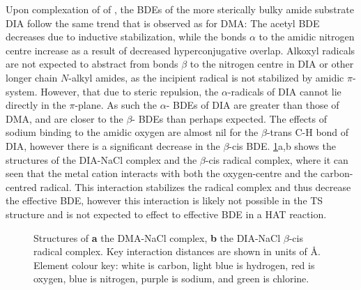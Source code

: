 Upon complexation of  of , the BDEs of the more sterically
bulky amide substrate DIA follow the same trend that is observed as for DMA:
The acetyl  BDE decreases due to inductive stabilization, while the
 bonds $\alpha$ to the amidic nitrogen centre increase as a result of
decreased hyperconjugative overlap. Alkoxyl radicals are not expected to
abstract from  bonds $\beta$ to the nitrogen centre in DIA or other
longer chain $N$-alkyl amides, as the incipient radical is not stabilized by
amidic $\pi$-system. However, that due to steric repulsion, the
$\alpha$-radicals of DIA cannot lie directly in the $\pi$-plane. As such the
$\alpha$- BDEs of DIA are greater than those of DMA, and are closer to
the $\beta$- BDEs than perhaps expected. The effects of sodium binding
to the amidic oxygen are almost nil for the $\beta$-trans C-H bond of DIA,
however there is a significant decrease in the $\beta$-cis  BDE.
\ref{fig:dia-na-cl}a,b shows the structures of the DIA-NaCl complex and the
$\beta$-cis radical complex, where it can seen that the metal cation interacts
with both the oxygen-centre and the carbon-centred radical. This interaction
stabilizes the radical complex and thus decrease the effective BDE, however
this interaction is likely not possible in the TS structure and is not expected
to effect to effective BDE in a HAT reaction.

\begin{figure}[!htbp]
	\centering


  \caption[Structures of the DIA-NaCl complex and radical complex.]{Structures
  of \textbf{a} the DMA-NaCl complex, \textbf{b} the DIA-NaCl $\beta$-cis
  radical complex. Key interaction distances are shown in units of \AA. Element
  colour key: white is carbon, light blue is hydrogen, red is oxygen, blue is
  nitrogen, purple is sodium, and green is chlorine.} \label{fig:dia-na-cl}
\end{figure}

